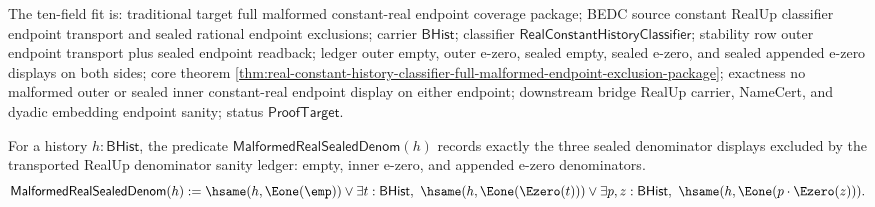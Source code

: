The ten-field fit is: traditional target full malformed constant-real endpoint
coverage package; BEDC source constant RealUp classifier endpoint transport
and sealed rational endpoint exclusions; carrier $\mathsf{BHist}$; classifier
$\mathsf{RealConstantHistoryClassifier}$; stability row outer endpoint
transport plus sealed endpoint readback; ledger outer empty, outer e-zero,
sealed empty, sealed e-zero, and sealed appended e-zero displays on both sides;
core theorem
\autoref{thm:real-constant-history-classifier-full-malformed-endpoint-exclusion-package};
exactness no malformed outer or sealed inner constant-real endpoint display on
either endpoint; downstream bridge RealUp carrier, NameCert, and dyadic
embedding endpoint sanity; status $\mathsf{ProofTarget}$.

\begin{definition}
\label{def:real-constant-malformed-sealed-denominator-display}
For a history $h:\mathsf{BHist}$, the predicate
$\mathsf{MalformedRealSealedDenom}(h)$ records exactly the three sealed
denominator displays excluded by the transported RealUp denominator sanity
ledger: empty, inner e-zero, and appended e-zero denominators.
$$
\mathsf{MalformedRealSealedDenom}(h)
:=
\hsame(h,\Eone(\emp))
\lor
\exists t:\mathsf{BHist},\
\hsame(h,\Eone(\Ezero(t)))
\lor
\exists p,z:\mathsf{BHist},\
\hsame(h,\Eone(p\cdot\Ezero(z))).
$$
\end{definition}

